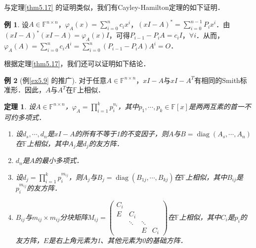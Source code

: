\documentclass[a4paper,fontset=windows]{ctexbook}
\newtheorem{theorem}{定理}[chapter]
\theoremstyle{definition}
\newtheorem{example}{例}[chapter]
\DeclareMathOperator{\diag}{diag}
\begin{document}
与定理\ref{thm5.17} 的证明类似，我们有Cayley-Hamilton定理的如下证明．

\begin{example}\label{ex5.18}
设$A\in\mathbb{F}^{n\times n}$，$\varphi_A(x)=\sum\limits_{i=0}^nc_ix^i$，$(xI-A)^*=\sum\limits_{i=0}^{n-1}P_ix^i$．由$(xI-A)^*(xI-A)=\varphi_A(x)I$，可得$P_{i-1}-P_iA=c_iI$，$\forall i$．从而，$\varphi_A(A)=\sum\limits_{i=0}^nc_iA^i=\sum\limits_{i=0}^n(P_{i-1}-P_iA)A^i=O$．
\end{example}

根据定理\ref{thm5.17}，我们还可以证明如下结论．

\begin{example}[例\ref{ex5.9} 的推广]
对于任意$A\in\mathbb{F}^{n\times n}$，$xI-A$与$xI-A^T$有相同的Smith标准形．因此，$A$与$A^T$在$\mathbb{F}$上相似．
\end{example}

\begin{theorem}\label{thm5.18}
设$A\in\mathbb{F}^{n\times n}$，$\varphi_A=\prod\limits_{i=1}^kp_i^{n_i}$，其中$p_1,\cdots,p_k\in\mathbb{F}[x]$是两两互素的首一不可约多项式．
\begin{enumerate}
\item 设$d_s,\cdots,d_n$是$xI-A$的所有不等于1的不变因子，则$A$与$B=\diag(A_s,\cdots,A_n)$在$\mathbb{F}$上相似，其中$A_j$是$d_j$的友方阵．

\item $d_n$是$A$的最小多项式．

\item 设$d_j=\prod\limits_{i=1}^kp_i^{m_{ij}}$，则$A_j$与$B_j=\diag(B_{1j},\cdots,B_{kj})$在$\mathbb{F}$上相似，其中$B_{ij}$是$p_i^{m_{ij}}$的友方阵．

\item $B_{ij}$与$m_{ij}\times m_{ij}$分块矩阵$M_{ij}=\begin{pmatrix}C_i&&& \\ E&C_i&& \\ &\ddots&\ddots& \\ &&E&C_i\end{pmatrix}$在$\mathbb{F}$上相似，其中$C_i$是$p_i$的友方阵，$E$是右上角元素为1、其他元素为0的基础方阵．
\end{enumerate}
\end{theorem}
\end{document}

